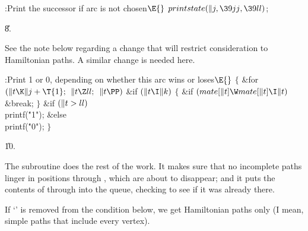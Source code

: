 \B{}:Print the successor if arc  is not chosen\X${}\E{}$\6
$\\{printstate}(\|j,\39\\{jj},\39\\{ll}){}$;\par
\U8.\fi

See the note below regarding a change that will restrict consideration
to Hamiltonian paths. A similar change is needed here.

\Y\B\4:Print 1 or 0, depending on whether this arc wins or loses\X${}\E{}$\6
${}\{{}$\1\6
\&{for} ${}(\|t\K\|j+\T{1};{}$ ${}\|t\Z\\{ll};{}$ ${}\|t\PP){}$\1\6
\&{if} ${}(\|t\I\|k){}$\5
${}\{{}$\1\6
\&{if} ${}(\\{mate}[\|t]\W\\{mate}[\|t]\I\|t){}$\1\5
\&{break};\2\6
\4${}\}{}$\2\2\6
\&{if} ${}(\|t>\\{ll}){}$\1\5
\\{printf}(\.{"1"});\2\6
\&{else}\1\5
\\{printf}(\.{"0"});\2\6
\4${}\}{}$\2\par
\U10.\fi

The  subroutine does the rest of the work. It makes
sure
that no incomplete paths linger in positions  through , which
are about to disappear; and it puts the contents of 
through
 into the queue, checking to see if it was already there.

If `' is removed from the condition below, we get
Hamiltonian paths only (I mean, simple paths that include every vertex).

